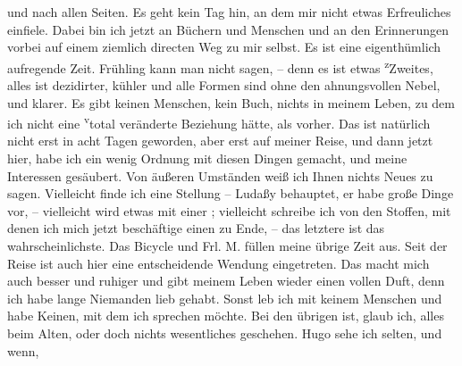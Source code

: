 \begin{ledgroupsized}[t]{13cm}
                  {\pb}und nach allen Seiten. Es
               geht kein Tag hin, an dem mir nicht etwas Erfreuliches einfiele. Dabei bin ich jetzt
               an Büchern und Menschen und an den Erinnerungen vorbei auf einem ziemlich directen
               Weg zu mir selbst. Es ist eine eigenthümlich aufregende Zeit. Frühling kann man nicht
               sagen, – denn es ist etwas \substVorne{}\textsuperscript{z}\substDazwischen{}Z\substHinten{}weites, alles ist dezidirter, kühler und alle Formen sind ohne den
               ahnungsvollen Nebel, und klarer. Es gibt keinen Menschen, kein Buch, nichts in meinem
               Leben, zu dem ich nicht eine \substVorne{}\textsuperscript{v}\substDazwischen{}t\substHinten{}otal veränderte Beziehung hätte, als vorher. Das ist natürlich nicht erst in
               acht Tagen geworden, aber erst auf meiner Reise, und dann jetzt hier, habe ich ein
               wenig Ordnung mit diesen Dingen gemacht, und meine Interessen gesäubert.\pend
           \pstart
           Von äußeren Umständen weiß ich Ihnen {\pb}nichts Neues zu sagen.
               Vielleicht finde ich eine Stellung – Ludaßy
               behauptet, \strikeout{\textcolor{gray}{d}} er habe große Dinge vor, – vielleicht wird etwas mit einer \label{K_L03264-1v}\label{K_L03264-1h}; vielleicht schreibe ich von den Stoffen, mit denen ich mich jetzt
               beschäftige einen zu Ende, – das letztere ist das wahrscheinlichste. \strikeout{\textcolor{gray}{×}\-\textcolor{gray}{×}\-\textcolor{gray}{×}} Das Bicycle und Frl. M. füllen meine
               übrige Zeit aus. Seit der Reise ist auch hier eine entscheidende Wendung eingetreten.
               Das macht mich auch besser und ruhiger und gibt meinem Leben wieder einen vollen
               Duft, denn ich habe lange Niemanden lieb gehabt. Sonst leb ich mit keinem Menschen
               und habe Keinen, mit dem ich sprechen möchte.\pend
           \pstart
           Bei den übrigen ist, glaub ich, alles beim Alten, oder doch nichts wesentliches
               geschehen. Hugo sehe ich selten, und wenn,

\end{ledgroupsized}
